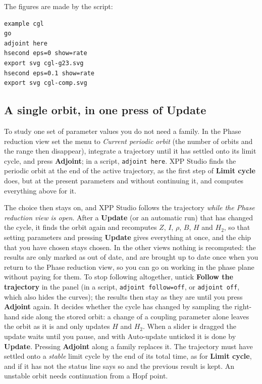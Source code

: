 \documentclass[11pt,a4paper]{article}
\newcommand{\XS}{\textsf{XPP Studio}}
\newcommand{\ui}[1]{\textsf{\textbf{#1}}}          %
\begin{document}
\noindent The figures are made by the script:\label{lst:cglscript}
\begin{lstlisting}
example cgl
go
adjoint here
hsecond eps=0 show=rate
export svg cgl-g23.svg
hsecond eps=0.1 show=rate
export svg cgl-comp.svg
\end{lstlisting}

\subsection*{A single orbit, in one press of \ui{Update}}\label{sec:adjhere}

To study one set of parameter values you do not need a family. In the Phase reduction view set the menu to \emph{Current periodic orbit} (the number of orbits and the range then disappear), integrate a trajectory until it has settled onto its limit cycle, and press \ui{Adjoint}; in a script, \texttt{adjoint here}. \XS{} finds the periodic orbit at the end of the active trajectory, as the first step of \ui{Limit cycle} does, but at the present parameters and without continuing it, and computes everything above for it.

The choice then stays on, and \XS{} follows the trajectory \emph{while the Phase reduction view is open}. After a \ui{Update} (or an automatic run) that has changed the cycle, it finds the orbit again and recomputes $Z$, $I$, $\rho$, $B$, $H$ and $H_2$, so that setting parameters and pressing \ui{Update} gives everything at once, and the chip that you have chosen stays chosen. In the other views nothing is recomputed: the results are only marked as out of date, and are brought up to date once when you return to the Phase reduction view, so you can go on working in the phase plane without paying for them. To stop following altogether, untick \ui{Follow the trajectory} in the panel (in a script, \texttt{adjoint follow=off}, or \texttt{adjoint off}, which also hides the curves); the results then stay as they are until you press \ui{Adjoint} again. It decides whether the cycle has changed by sampling the right-hand side along the stored orbit: a change of a coupling parameter alone leaves the orbit as it is and only updates $H$ and $H_2$. When a slider is dragged the update waits until you pause, and with Auto-update unticked it is done by \ui{Update}. Pressing \ui{Adjoint} along a family replaces it. The trajectory must have settled onto a \emph{stable} limit cycle by the end of its total time, as for \ui{Limit cycle}, and if it has not the status line says so and the previous result is kept. An unstable orbit needs continuation from a Hopf point.
\end{document}
